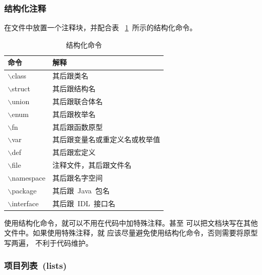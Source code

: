 \subsubsection{结构化注释}

在文件中放置一个注释块，并配合表
~\ref{tab:design:doc_scmd}~所示的结构化命令。

\begin{table}[h]
  \centering
  \caption{结构化命令}\label{tab:design:doc_scmd}
\begin{tabular}{|l|l|}
  \hline
  \textbf{命令} & \textbf{解释} \\
  \hline\hline
  $\backslash$class & 其后跟类名 \\
  \hline
  $\backslash$struct & 其后跟结构名 \\
  \hline
  $\backslash$union & 其后跟联合体名 \\
  \hline
  $\backslash$enum & 其后跟枚举名 \\
  \hline
  $\backslash$fn & 其后跟函数原型 \\
  \hline
  $\backslash$var & 其后跟变量名或重定义名或枚举值 \\
  \hline
  $\backslash$def & 其后跟宏定义 \\
  \hline
  $\backslash$file & 注释文件，其后跟文件名 \\
  \hline
  $\backslash$namespace & 其后跟名字空间 \\
  \hline
  $\backslash$package & 其后跟~Java~包名 \\
  \hline
  $\backslash$interface & 其后跟~IDL~接口名 \\
  \hline
\end{tabular}

\end{table}

使用结构化命令，就可以不用在代码中加特殊注释。甚至
可以把文档块写在其他文件中。如果使用特殊注释，就
应该尽量避免使用结构化命令，否则需要将原型写两遍，
不利于代码维护。

\subsubsection{项目列表~(lists)}

